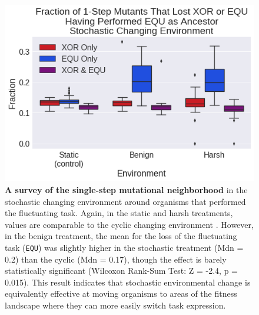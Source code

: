\documentclass[PhD]{msu-thesis}
\begin{document}
	\begin{figure}[!h] %
	\includegraphics[width=0.75\columnwidth]{figures/CE/CSE_frac_1step__filtered__box.png}
	\caption{\textbf{A survey of the single-step mutational neighborhood} in the stochastic changing environment around organisms that performed the fluctuating task. Again, in the static and harsh treatments, values are comparable to the cyclic changing environment . However, in the benign treatment, the mean for the loss of the fluctuating task (\texttt{EQU}) was slightly higher in the stochastic treatment (Mdn = 0.2) than the cyclic (Mdn = 0.17), though the effect is barely statistically significant (Wilcoxon Rank-Sum Test: Z = -2.4, p = 0.015). This result indicates that stochastic environmental change is equivalently effective at moving organisms to areas of the fitness landscape where they can more easily switch task expression.%
	}\label{fig:CSE_single_step}
	\end{figure}
\end{document}
